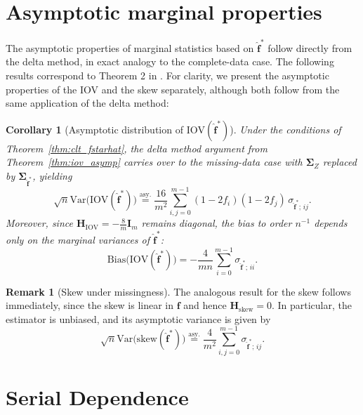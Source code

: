 ﻿\documentclass[12pt,a4paper]{scrreprt}
\newtheorem{corollary}[theorem]{Corollary}
\theoremstyle{definition}
\newtheorem{remark}[theorem]{Remark}
\begin{document}
\section{Asymptotic marginal properties}
The asymptotic properties of marginal statistics based on $\hat{\boldsymbol{f}}^*$
follow directly from the delta method, in exact analogy to the complete-data case.
The following results correspond to Theorem 2 in \citet{weiss2021categorical}. For clarity, we 
present the asymptotic properties of the IOV and the skew separately, although both 
follow from the same application of the delta method: 
\begin{corollary}[Asymptotic distribution of $\mathrm{IOV}(\hat{\boldsymbol{f}}^*)$]\label{cor:iov_missing}
Under the conditions of Theorem~\ref{thm:clt_fstarhat}, the delta method argument from Theorem~\ref{thm:iov_asymp} 
carries over to the missing-data case with $\boldsymbol{\Sigma}_Z$ replaced by
$\boldsymbol{\Sigma}_{\hat{\boldsymbol{f}}^*}$, yielding
\[
    \sqrt{n}\mathrm{Var}\bigl(\mathrm{IOV}(\hat{\boldsymbol{f}}^*)\bigr)
    \overset{\mathrm{asy.}}{=}
    \frac{16}{m^2} \sum_{i,j=0}^{m-1}(1-2f_i)(1-2f_j)\,\sigma_{\hat{\boldsymbol{f}}^*;\, ij}.
\]
Moreover, since $\boldsymbol{H}_{\mathrm{IOV}} = -\frac{8}{m}\boldsymbol{I}_m$ remains
diagonal, the bias to order $n^{-1}$ depends only on the marginal variances of
$\hat{\boldsymbol{f}}^*$:
\[
    \mathrm{Bias}\bigl(\mathrm{IOV}(\hat{\boldsymbol{f}}^*)\bigr)
    = -\frac{4}{mn}\sum_{i=0}^{m-1}\sigma_{\hat{\boldsymbol{f}}^*;\, ii}.
\]
\end{corollary} 
\begin{remark}[Skew under missingness]
The analogous result for the skew follows immediately, since the skew is linear in
$\boldsymbol{f}$ and hence $\boldsymbol{H}_{\mathrm{skew}} = 0$. In particular, the
estimator is unbiased, and its asymptotic variance is given by
\[
    \sqrt{n}\mathrm{Var}\bigl(\mathrm{skew}(\hat{\boldsymbol{f}}^*)\bigr)
    \overset{\mathrm{asy.}}{=}
    \frac{4}{m^2}\sum_{i,j=0}^{m-1}\sigma_{\hat{\boldsymbol{f}}^*;\, ij}.
\]
\end{remark}

\section{Serial Dependence}
\label{sec:serial-dependence}
\end{document}
